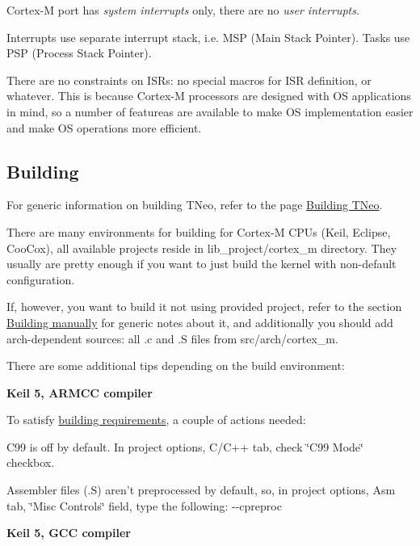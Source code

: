 Cortex-\/\+M port has {\itshape system interrupts} only, there are no {\itshape user interrupts}.

Interrupts use separate interrupt stack, i.\+e. M\+S\+P (Main Stack Pointer). Tasks use P\+S\+P (Process Stack Pointer).

There are no constraints on I\+S\+Rs\+: no special macros for I\+S\+R definition, or whatever. This is because Cortex-\/\+M processors are designed with O\+S applications in mind, so a number of featureas are available to make O\+S implementation easier and make O\+S operations more efficient.\hypertarget{arch_specific_cortex_m_building}{}\subsection{Building}\label{arch_specific_cortex_m_building}
For generic information on building T\+Neo, refer to the page \hyperlink{building}{Building T\+Neo}.

There are many environments for building for Cortex-\/\+M C\+P\+Us (Keil, Eclipse, Coo\+Cox), all available projects reside in {\ttfamily lib\+\_\+project/cortex\+\_\+m} directory. They usually are pretty enough if you want to just build the kernel with non-\/default configuration.

If, however, you want to build it not using provided project, refer to the section \hyperlink{building_building_generic__manual}{Building manually} for generic notes about it, and additionally you should add arch-\/dependent sources\+: all {\ttfamily .c} and {\ttfamily .S} files from {\ttfamily src/arch/cortex\+\_\+m}.

There are some additional tips depending on the build environment\+:

{\bfseries Keil 5, A\+R\+M\+C\+C compiler}

To satisfy \hyperlink{building_building_generic__manual}{building requirements}, a couple of actions needed\+:


\begin{DoxyItemize}
\item C99 is off by default. In project options, C/\+C++ tab, check \char`\"{}\+C99 Mode\char`\"{} checkbox.
\item Assembler files ({\ttfamily .S}) aren't preprocessed by default, so, in project options, Asm tab, \char`\"{}\+Misc Controls\char`\"{} field, type the following\+: {\ttfamily -\/-\/cpreproc}
\end{DoxyItemize}

{\bfseries Keil 5, G\+C\+C compiler}

